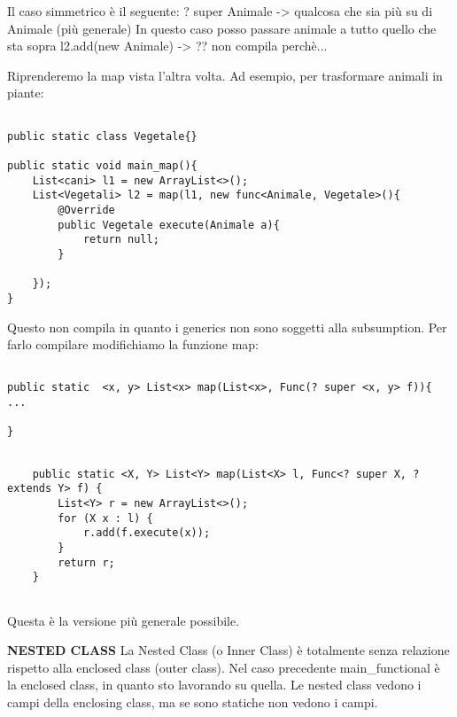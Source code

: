 \noindent Il caso simmetrico è il seguente: \newline
? super Animale -> qualcosa che sia più su di Animale (più generale) \newline
In questo caso posso passare animale a tutto quello che sta sopra
l2.add(new Animale) -> ?? non compila perchè... \newline





\noindent Riprenderemo la map vista l'altra volta. Ad esempio, per trasformare animali in piante: 

\begin{lstlisting}[basicstyle=\small,]

public static class Vegetale{}

public static void main_map(){
	List<cani> l1 = new ArrayList<>();
	List<Vegetali> l2 = map(l1, new func<Animale, Vegetale>(){
		@Override
		public Vegetale execute(Animale a){
			return null;
		}
	
	});
}

\end{lstlisting}

\noindent Questo non compila in quanto i generics non sono soggetti alla subsumption. \newline
Per farlo compilare modifichiamo la funzione map: 

\begin{lstlisting}[basicstyle=\small,]

public static  <x, y> List<x> map(List<x>, Func(? super <x, y> f)){
...

}

\end{lstlisting}

\begin{lstlisting}[basicstyle=\small,]

    public static <X, Y> List<Y> map(List<X> l, Func<? super X, ? extends Y> f) {
        List<Y> r = new ArrayList<>();
        for (X x : l) {
            r.add(f.execute(x));
        }
        return r;
    }
    
\end{lstlisting}

Questa è la versione più generale possibile. \newline


\noindent \textbf{NESTED CLASS}\newline
La Nested Class (o Inner Class) è totalmente senza relazione rispetto alla enclosed class (outer class).\newline
Nel caso precedente main{\_}functional è la enclosed class, in quanto sto lavorando su quella. \newline
Le nested class vedono i campi della enclosing class, ma se sono statiche non vedono i campi. 


